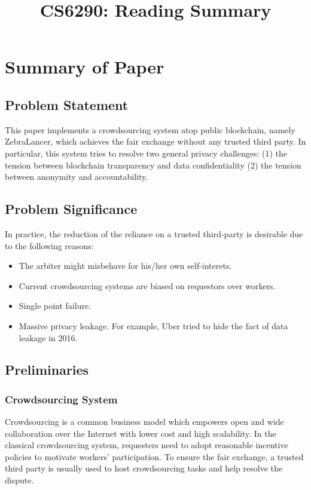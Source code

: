 \documentclass[conference]{IEEEtran}
\begin{document}
\title{CS6290: Reading Summary }

\author{
}

\maketitle

\section{Summary of Paper \cite{lu2018zebralancer}}

\subsection{Problem Statement}
This paper implements a crowdsourcing system atop public blockchain, namely ZebraLancer, which achieves the fair exchange without any trusted third party.
%
In particular, this system tries to resolve two general privacy challenges: (1) the tension between blockchain transparency and data confidentiality (2) the tension between anonymity and accountability. 

\subsection{Problem Significance}
In practice, the reduction of the reliance on a trusted third-party is desirable due to the following reasons:
%
\begin{itemize}
    \item The arbiter might misbehave for his/her own self-interets. 
    \item Current crowdsourcing systems are biased on requestors over workers.
    \item Single point failure.
    \item Massive privacy leakage. For example, Uber tried to hide the fact of data leakage in 2016.  
\end{itemize}
 
\subsection{Preliminaries}
\subsubsection{Crowdsourcing System}
Crowdsourcing is a common business model which empowers open and wide collaboration over the Internet with lower cost and high scalability.
%
In the classical crowdsourcing system, requesters need to adopt reasonable incentive policies to motivate workers' participation.
%
To ensure the fair exchange, a trusted third party is usually used to host crowdsourcing tasks and help resolve the dispute.
%
\end{document}
